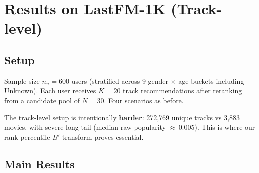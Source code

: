 \section{Results on LastFM-1K (Track-level)}
\label{sec:results-lfm1k}

\subsection{Setup}

Sample size $n_u = 600$ users (stratified across 9 gender $\times$ age buckets including \textsf{Unknown}). Each user receives $K=20$ track recommendations after reranking from a candidate pool of $N=30$. Four scenarios as before.

The track-level setup is intentionally \textbf{harder}: 272{,}769 unique tracks vs 3{,}883 movies, with severe long-tail (median raw popularity ${\approx}\,0.005$). This is where our rank-percentile $B'$ transform proves essential.

\subsection{Main Results}

